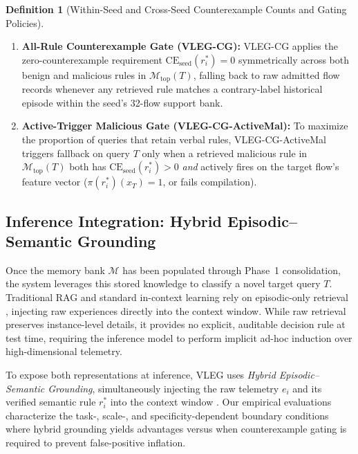 \documentclass[10pt,a4paper,onecolumn]{article}
\theoremstyle{definition}
\newtheorem{definition}{Definition}
\theoremstyle{remark}
\begin{document}
\begin{definition}[Within-Seed and Cross-Seed Counterexample Counts and Gating Policies]
\begin{enumerate}[leftmargin=1.8em]
    \item \textbf{All-Rule Counterexample Gate (VLEG-CG):} VLEG-CG applies the zero-counterexample requirement $\mathrm{CE}_{\mathrm{seed}}(r_i^*) = 0$ symmetrically across both benign and malicious rules in $\mathcal{M}_{\mathrm{top}}(T)$, falling back to raw admitted flow records whenever any retrieved rule matches a contrary-label historical episode within the seed's 32-flow support bank.
    \item \textbf{Active-Trigger Malicious Gate (VLEG-CG-ActiveMal):} To maximize the proportion of queries that retain verbal rules, VLEG-CG-ActiveMal triggers fallback on query $T$ only when a retrieved malicious rule in $\mathcal{M}_{\mathrm{top}}(T)$ both has $\mathrm{CE}_{\mathrm{seed}}(r_i^*) > 0$ \emph{and} actively fires on the target flow's feature vector ($\pi(r_i^*)(x_T) = 1$, or fails compilation).
\end{enumerate}
\end{definition}

\subsection{Inference Integration: Hybrid Episodic--Semantic Grounding}
Once the memory bank $\mathcal{M}$ has been populated through Phase~1 consolidation, the system leverages this stored knowledge to classify a novel target query $T$. Traditional RAG and standard in-context learning rely on episodic-only retrieval \cite{lewis2020retrieval,zhang2022active}, injecting raw experiences directly into the context window. While raw retrieval preserves instance-level details, it provides no explicit, auditable decision rule at test time, requiring the inference model to perform implicit ad-hoc induction over high-dimensional telemetry.

To expose both representations at inference, VLEG uses \textit{Hybrid Episodic--Semantic Grounding}, simultaneously injecting the raw telemetry $e_i$ and its verified semantic rule $r_i^*$ into the context window \cite{wu2025from,zhang2024survey}. Our empirical evaluations characterize the task-, scale-, and specificity-dependent boundary conditions where hybrid grounding yields advantages versus when counterexample gating is required to prevent false-positive inflation.
\end{document}
